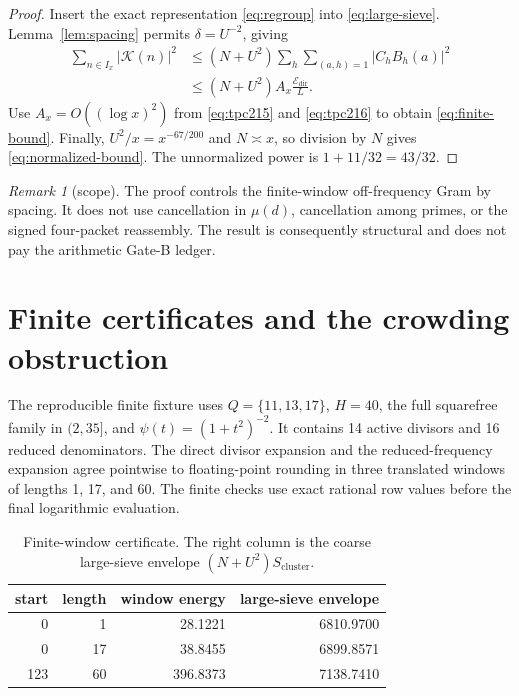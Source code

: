 \documentclass[11pt]{article}
\theoremstyle{definition}
\theoremstyle{remark}
\newtheorem{remark}[theorem]{Remark}
\newcommand{\Kphys}{\mathcal K}
\newcommand{\Edir}{\mathcal E_{\mathrm{dir}}}
\begin{document}
\begin{proof}
Insert the exact representation \eqref{eq:regroup} into \eqref{eq:large-sieve}.
Lemma~\ref{lem:spacing} permits $\delta=U^{-2}$, giving
\begin{align}
 \sum_{n\in I_x}|\Kphys(n)|^2
 &\le (N+U^2)
 \sum_h\sum_{(a,h)=1}|C_hB_h(a)|^2\\
 &\le (N+U^2)A_x\frac{\Edir}{L}.
 \label{eq:chain}
\end{align}
Use $A_x=O((\log x)^2)$ from \eqref{eq:tpc215} and
\eqref{eq:tpc216} to obtain \eqref{eq:finite-bound}.  Finally,
\(U^2/x=x^{-67/200}\) and $N\asymp x$, so division by $N$ gives
\eqref{eq:normalized-bound}.  The unnormalized power is
\(1+11/32=43/32\).
\end{proof}

\begin{remark}[scope]
The proof controls the finite-window off-frequency Gram by spacing.  It does
not use cancellation in $\mu(d)$, cancellation among primes, or the signed
four-packet reassembly.  The result is consequently structural and does not
pay the arithmetic Gate-B ledger.
\end{remark}

\section{Finite certificates and the crowding obstruction}

The reproducible finite fixture uses $Q=\{11,13,17\}$, $H=40$, the full
squarefree family in $(2,35]$, and $\psi(t)=(1+t^2)^{-2}$.  It contains 14
active divisors and 16 reduced denominators.  The direct divisor expansion and
the reduced-frequency expansion agree pointwise to floating-point rounding in
three translated windows of lengths 1, 17, and 60.  The finite checks use exact
rational row values before the final logarithmic evaluation.

\begin{table}[h]
\centering
\caption{Finite-window certificate.  The right column is the coarse
large-sieve envelope $(N+U^2)S_{\mathrm{cluster}}$.}
\label{tab:certificate}
\begin{tabular}{@{}rrrr@{}}
\toprule
start & length & window energy & large-sieve envelope\\
\midrule
0 & 1 & 28.1221 & 6810.9700\\
0 & 17 & 38.8455 & 6899.8571\\
123 & 60 & 396.8373 & 7138.7410\\
\bottomrule
\end{tabular}
\end{table}
\end{document}
